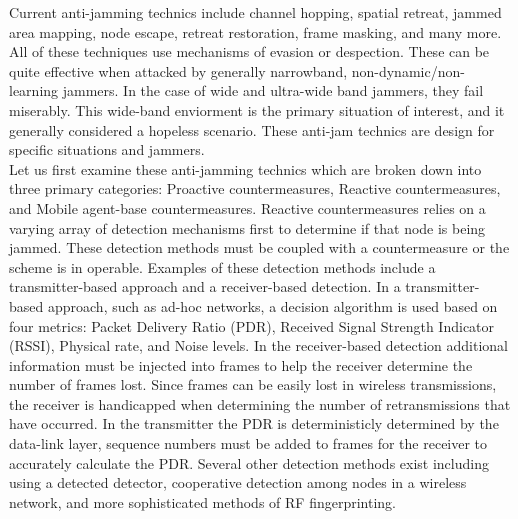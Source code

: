 Current anti-jamming technics include channel hopping, spatial retreat, jammed area mapping, node escape, retreat restoration, frame masking, and many more\cite{1}.  All of these techniques use mechanisms of evasion or despection.  These can be quite effective when attacked by generally narrowband, non-dynamic/non-learning jammers.  In the case of wide and ultra-wide band jammers, they fail miserably.  This wide-band enviorment is the primary situation of interest, and it generally considered a hopeless scenario.  These anti-jam technics are design for specific situations and jammers.\\

Let us first examine these anti-jamming technics which are broken down into three primary categories: Proactive countermeasures, Reactive countermeasures, and Mobile agent-base countermeasures\cite{1}.  Reactive countermeasures relies on a varying array of detection mechanisms first to determine if that node is being jammed.  These detection methods  must be coupled with a countermeasure or the scheme is in operable.  Examples of these detection methods include a transmitter-based approach and a receiver-based detection.  In a transmitter-based approach, such as ad-hoc networks, a decision algorithm is used based on four metrics: Packet Delivery Ratio (PDR), Received Signal Strength Indicator (RSSI), Physical rate, and Noise levels\cite{3}.  In the receiver-based detection additional information must be injected into frames to help the receiver determine the number of frames lost.  Since frames can be easily lost in wireless transmissions, the receiver is handicapped when determining the number of retransmissions that have occurred.  In the transmitter the PDR is deterministicly determined by the data-link layer, sequence numbers must be added to frames for the receiver to accurately calculate the PDR\cite{3}.  Several other detection methods exist including using a detected detector, cooperative detection among nodes in a wireless network, and more sophisticated methods of RF fingerprinting\cite{3}.\\

